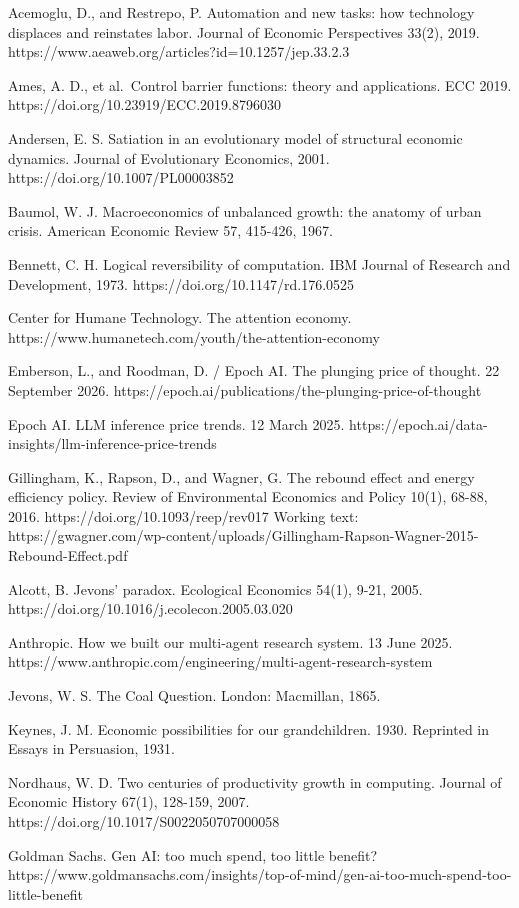 \documentclass[
  10pt,
]{article}
\begin{document}
Acemoglu, D., and Restrepo, P. Automation and new tasks: how technology
displaces and reinstates labor. Journal of Economic Perspectives 33(2),
2019. https://www.aeaweb.org/articles?id=10.1257/jep.33.2.3

Ames, A. D., et al.~Control barrier functions: theory and applications.
ECC 2019. https://doi.org/10.23919/ECC.2019.8796030

Andersen, E. S. Satiation in an evolutionary model of structural
economic dynamics. Journal of Evolutionary Economics, 2001.
https://doi.org/10.1007/PL00003852

Baumol, W. J. Macroeconomics of unbalanced growth: the anatomy of urban
crisis. American Economic Review 57, 415-426, 1967.

Bennett, C. H. Logical reversibility of computation. IBM Journal of
Research and Development, 1973. https://doi.org/10.1147/rd.176.0525

Center for Humane Technology. The attention economy.
https://www.humanetech.com/youth/the-attention-economy

Emberson, L., and Roodman, D. / Epoch AI. The plunging price of thought.
22 September 2026.
https://epoch.ai/publications/the-plunging-price-of-thought

Epoch AI. LLM inference price trends. 12 March 2025.
https://epoch.ai/data-insights/llm-inference-price-trends

Gillingham, K., Rapson, D., and Wagner, G. The rebound effect and energy
efficiency policy. Review of Environmental Economics and Policy 10(1),
68-88, 2016. https://doi.org/10.1093/reep/rev017 Working text:
https://gwagner.com/wp-content/uploads/Gillingham-Rapson-Wagner-2015-Rebound-Effect.pdf

Alcott, B. Jevons' paradox. Ecological Economics 54(1), 9-21, 2005.
https://doi.org/10.1016/j.ecolecon.2005.03.020

Anthropic. How we built our multi-agent research system. 13 June 2025.
https://www.anthropic.com/engineering/multi-agent-research-system

Jevons, W. S. The Coal Question. London: Macmillan, 1865.

Keynes, J. M. Economic possibilities for our grandchildren. 1930.
Reprinted in Essays in Persuasion, 1931.

Nordhaus, W. D. Two centuries of productivity growth in computing.
Journal of Economic History 67(1), 128-159, 2007.
https://doi.org/10.1017/S0022050707000058

Goldman Sachs. Gen AI: too much spend, too little benefit?
https://www.goldmansachs.com/insights/top-of-mind/gen-ai-too-much-spend-too-little-benefit
\end{document}

